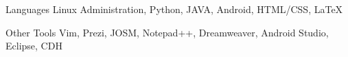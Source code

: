 


\begin{cvskills}


\cvskill
{Languages} %
{Linux Administration, Python, JAVA, Android, HTML/CSS, LaTeX}





\cvskill
{Other Tools} %
{Vim, Prezi, JOSM, Notepad++, Dreamweaver, Android Studio, Eclipse, CDH } %






\end{cvskills}